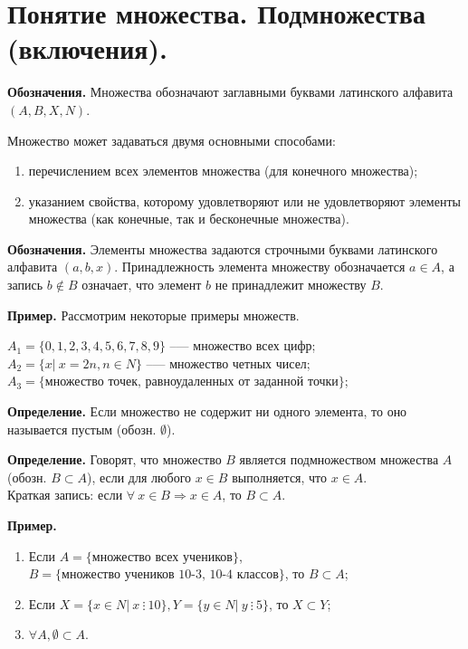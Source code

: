 \documentclass{article}
\begin{document}
    \section{Понятие множества. Подмножества (включения).}

    \textbf{Обозначения.} Множества обозначают заглавными буквами латинского алфавита $(A, B, X, N)$. 
    
    Множество может задаваться двумя основными способами: 
    
    \begin{enumerate}
        \item перечислением всех элементов множества (для конечного множества); 
        \item указанием свойства, которому удовлетворяют или не удовлетворяют элементы множества (как конечные, так и бесконечные множества). 
    \end{enumerate}
    
    \textbf{Обозначения.} Элементы множества задаются строчными буквами латинского алфавита $(a, b, x)$. Принадлежность элемента множеству обозначается $a \in A$, а запись $b \not\in B$ означает, что элемент $b$ не принадлежит множеству $B$. 

    \textbf{Пример.} Рассмотрим некоторые примеры множеств. 

    $A_1 = \{0,1,2,3,4,5,6,7,8,9\}$ --— множество всех цифр;\\
    $A_2 = \{x |\ x = 2n, n \in N\}$ --— множество четных чисел;\\ 
    $A_3= \{\textrm{множество точек, равноудаленных от заданной точки}\}$;
    
    \textbf{Определение.} Если множество не содержит ни одного элемента, то оно называется пустым (обозн. $\emptyset$). 
    
    \textbf{Определение.} Говорят, что множество $B$ является подмножеством множества $A$ (обозн. $B \subset A$), если для любого $x \in B$ выполняется, что $x \in A$.\\
    Краткая запись: если $\forall\ x \in B \Rightarrow x \in A$, то $B \subset A$. 

    \textbf{Пример.}  
    
    \begin{enumerate}
        \item Если $A = \{\textrm{множество всех учеников}\}$, $B = \{\textrm{множество учеников 10-3, 10-4 классов}\}$, то $B \subset A$;
        \item Если $X = \{ x \in N |\ x\ \vdots\ 10\}, Y = \{ y \in N |\ y\ \vdots\ 5\}$, то $X \subset Y$;
        \item $\forall A, \emptyset \subset A$. 
    \end{enumerate}
\end{document}
